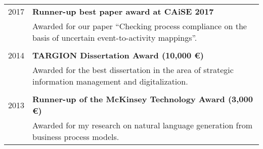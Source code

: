 \raggedright
\begin{tabular}{P{3cm}P{12cm}}
2017 	& \textbf{Runner-up best paper award at CAiSE 2017} \\
			& Awarded for our paper ``Checking process compliance on the basis of uncertain event-to-activity mappings''. \\
			\\
2014 	&  \textbf{TARGION Dissertation Award (10,000 \euro)}  \\
			& Awarded for the best dissertation in the area of strategic information management and digitalization. \\
			\\
2013	& \textbf{Runner-up of the McKinsey Technology Award (3,000 \euro)} \\
			& Awarded for my research on natural language generation from business process models. \\
\end{tabular}